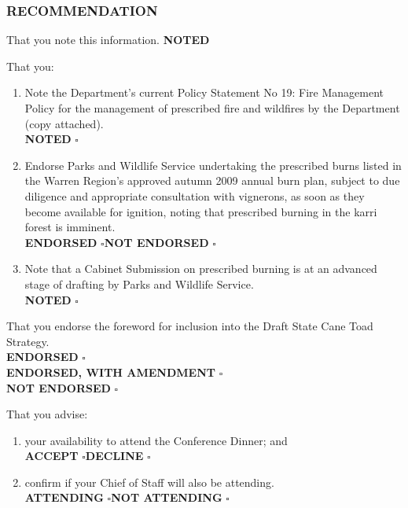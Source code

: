 {{{{{{{{{{{{{{\subsubsection{RECOMMENDATION}
{%
\normalsize That you note this information. \hfill \textbf{NOTED} \Huge\square
{%
\normalsize That you:
\begin{enumerate} \itemsep -0pt
\item Note the Department’s current Policy Statement No 19: Fire Management Policy for the management of prescribed fire and wildfires by the Department (copy attached). \\ \hspace*{65mm} \textbf{NOTED} \Huge$\square$\normalsize

\item Endorse Parks and Wildlife Service undertaking the prescribed burns listed in the Warren Region’s approved autumn 2009 annual burn plan, subject to due diligence and appropriate consultation with vignerons, as soon as they become available for ignition, noting that prescribed burning in the karri forest is imminent. \\ \hspace*{65mm} \textbf{ENDORSED} \Huge$\square$\normalsize \textbf{NOT ENDORSED} \Huge$\square$\normalsize

\item Note that a Cabinet Submission on prescribed burning is at an advanced stage of drafting by Parks and Wildlife Service. \\ \hspace*{65mm} \textbf{NOTED} \Huge$\square$\normalsize

\end{enumerate}
{%
\normalsize That you endorse the foreword for inclusion into the Draft State Cane Toad Strategy.
\\ \hspace*{65mm} \textbf{ENDORSED} \Huge$\square$\normalsize
\\ \hspace*{65mm} \textbf{ENDORSED, WITH AMENDMENT} \Huge$\square$\normalsize
\\ \hspace*{65mm} \textbf{NOT ENDORSED} \Huge$\square$\normalsize

{%
\normalsize That you advise:
\begin{enumerate}
\item your availability to attend the Conference Dinner; and \\ \hspace*{65mm} \textbf{ACCEPT} \Huge$\square$\normalsize \textbf{DECLINE} \Huge$\square$\normalsize
\item confirm if your Chief of Staff will also be attending. \\ \hspace*{65mm} \textbf{ATTENDING} \Huge$\square$\normalsize \textbf{NOT ATTENDING} \Huge$\square$\normalsize
\end{enumerate}
{%

}}}}}}}}}}}}}}}}}}}

